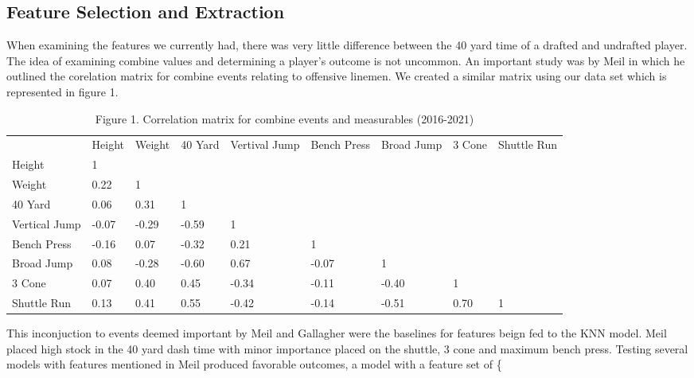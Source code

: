 \documentclass[confrence]{IEEEtran}
\begin{document}
\subsection*{Feature Selection and Extraction}
When examining the features we currently had, there was very little difference between the 40 yard time of a drafted and undrafted player. 
The idea of examining combine values and determining a player's outcome is not uncommon. 
An important study was by Meil in which he outlined the corelation matrix for combine events relating to offensive linemen.
We created a similar matrix using our data set which is represented in figure 1. 
\begin{table*}[htbp]
\begin{tabular}{lllllllll}
              & Height & Weight & 40 Yard & Vertival Jump & Bench Press & Broad Jump & 3 Cone & Shuttle Run \\
Height        & 1      &        &         &               &             &            &        &             \\
Weight        & 0.22   & 1      &         &               &             &            &        &             \\
40 Yard       & 0.06   & 0.31   & 1       &               &             &            &        &             \\
Vertical Jump & -0.07  & -0.29  & -0.59   & 1             &             &            &        &             \\
Bench Press   & -0.16  & 0.07   & -0.32   & 0.21          & 1           &            &        &             \\
Broad Jump    & 0.08   & -0.28  & -0.60   & 0.67          & -0.07       & 1          &        &             \\
3 Cone        & 0.07   & 0.40   & 0.45    & -0.34         & -0.11       & -0.40      & 1      &             \\
Shuttle Run   & 0.13   & 0.41   & 0.55    & -0.42         & -0.14       & -0.51      & 0.70   & 1          
\end{tabular}
\caption*{Figure 1. Correlation matrix for combine events and measurables (2016-2021)}
\end{table*}
This inconjuction to events deemed important by Meil and Gallagher were the baselines for features beign fed to the KNN model. 
Meil placed high stock in the 40 yard dash time with minor importance placed on the shuttle, 3 cone and maximum bench press. 
Testing several models with features mentioned in Meil produced favorable outcomes, a model with a feature set of  \{
\end{document}

